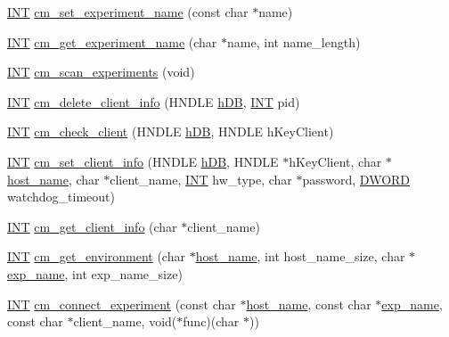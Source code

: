 \begin{DoxyCompactItemize}
\item 
\hyperlink{vppg_8h_a392e62da233ed3e2f7c3fd4f487a3896}{INT} \hyperlink{group__cmfunctionc_gafe97f63815e3eacedd504bca6b22032a}{cm\_\-set\_\-experiment\_\-name} (const char $\ast$name)
\item 
\hyperlink{vppg_8h_a392e62da233ed3e2f7c3fd4f487a3896}{INT} \hyperlink{group__cmfunctionc_ga0ca8a626fc6fbdbfde87294eb38ad94d}{cm\_\-get\_\-experiment\_\-name} (char $\ast$name, int name\_\-length)
\item 
\hyperlink{vppg_8h_a392e62da233ed3e2f7c3fd4f487a3896}{INT} \hyperlink{group__cmfunctionc_gacd0316ccf242cd450281c5fd153a985b}{cm\_\-scan\_\-experiments} (void)
\item 
\hyperlink{vppg_8h_a392e62da233ed3e2f7c3fd4f487a3896}{INT} \hyperlink{group__cmfunctionc_gace4f91b59217b2dc6216065cc41377a1}{cm\_\-delete\_\-client\_\-info} (HNDLE \hyperlink{mevb_8c_ab1f60c53f74e806a3b9f687af38d7421}{hDB}, \hyperlink{vppg_8h_a392e62da233ed3e2f7c3fd4f487a3896}{INT} pid)
\item 
\hyperlink{vppg_8h_a392e62da233ed3e2f7c3fd4f487a3896}{INT} \hyperlink{group__cmfunctionc_ga43f5554b3e5296a0f92ec3d6aa15ed30}{cm\_\-check\_\-client} (HNDLE \hyperlink{mevb_8c_ab1f60c53f74e806a3b9f687af38d7421}{hDB}, HNDLE hKeyClient)
\item 
\hyperlink{vppg_8h_a392e62da233ed3e2f7c3fd4f487a3896}{INT} \hyperlink{group__cmfunctionc_gae50ca92a705efaed76dd1204a3caa32e}{cm\_\-set\_\-client\_\-info} (HNDLE \hyperlink{mevb_8c_ab1f60c53f74e806a3b9f687af38d7421}{hDB}, HNDLE $\ast$hKeyClient, char $\ast$\hyperlink{mevb_8c_af65cc3664520b7cd0817adc7106f9624}{host\_\-name}, char $\ast$client\_\-name, \hyperlink{vppg_8h_a392e62da233ed3e2f7c3fd4f487a3896}{INT} hw\_\-type, char $\ast$password, \hyperlink{vt2_8h_a798af1e30bc65f319c1a246cecf59e39}{DWORD} watchdog\_\-timeout)
\item 
\hyperlink{vppg_8h_a392e62da233ed3e2f7c3fd4f487a3896}{INT} \hyperlink{group__cmfunctionc_ga0aa3002f758a710360b90a50500fc784}{cm\_\-get\_\-client\_\-info} (char $\ast$client\_\-name)
\item 
\hyperlink{vppg_8h_a392e62da233ed3e2f7c3fd4f487a3896}{INT} \hyperlink{group__cmfunctionc_gaa483e7c17ff962fd6cdfa581f4989f54}{cm\_\-get\_\-environment} (char $\ast$\hyperlink{mevb_8c_af65cc3664520b7cd0817adc7106f9624}{host\_\-name}, int host\_\-name\_\-size, char $\ast$\hyperlink{mfe_8c_a11eee1a5e2cef985b90bdfe0bfc8cf76}{exp\_\-name}, int exp\_\-name\_\-size)
\item 
\hyperlink{vppg_8h_a392e62da233ed3e2f7c3fd4f487a3896}{INT} \hyperlink{group__cmfunctionc_ga1e96495bb5b89e4ea770a1ea7bc7787b}{cm\_\-connect\_\-experiment} (const char $\ast$\hyperlink{mevb_8c_af65cc3664520b7cd0817adc7106f9624}{host\_\-name}, const char $\ast$\hyperlink{mfe_8c_a11eee1a5e2cef985b90bdfe0bfc8cf76}{exp\_\-name}, const char $\ast$client\_\-name, void($\ast$func)(char $\ast$))

\end{DoxyCompactItemize}
